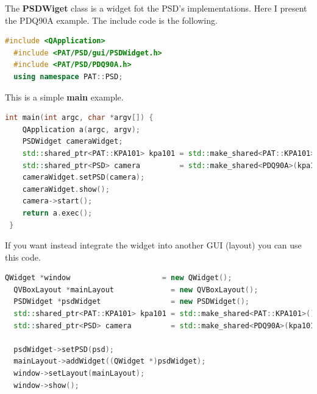 
The \textbf{PSDWiget} class is a widget fot the PSD's implementations.
Here I present the PDQ90A example. The include code is the following.

\begin{lstlisting}[language=c++, gobble=2]
  #include <QApplication>
  #include <PAT/PSD/gui/PSDWidget.h>
  #include <PAT/PSD/PDQ90A.h>
  using namespace PAT::PSD;
\end{lstlisting}

This is a simple \textbf{main} example.

\begin{lstlisting}[language=c++, gobble=2]
  int main(int argc, char *argv[]) {
    QApplication a(argc, argv);
    PSDWidget cameraWidget;
    std::shared_ptr<PAT::KPA101> kpa101 = std::make_shared<PAT::KPA101>();
    std::shared_ptr<PSD> camera         = std::make_shared<PDQ90A>(kpa101);
    cameraWidget.setPSD(camera);
    cameraWidget.show();
    camera->start();
    return a.exec();
 }
\end{lstlisting}

If you want instead integrate the widget into another GUI (layout) you
can use this code.

\begin{lstlisting}[language=c++, gobble=2]
  QWidget *window                     = new QWidget();
  QVBoxLayout *mainLayout             = new QVBoxLayout();
  PSDWidget *psdWidget                = new PSDWidget();
  std::shared_ptr<PAT::KPA101> kpa101 = std::make_shared<PAT::KPA101>();
  std::shared_ptr<PSD> camera         = std::make_shared<PDQ90A>(kpa101);
  
  psdWidget->setPSD(psd);
  mainLayout->addWidget((QWidget *)psdWidget);
  window->setLayout(mainLayout);
  window->show();
\end{lstlisting}


